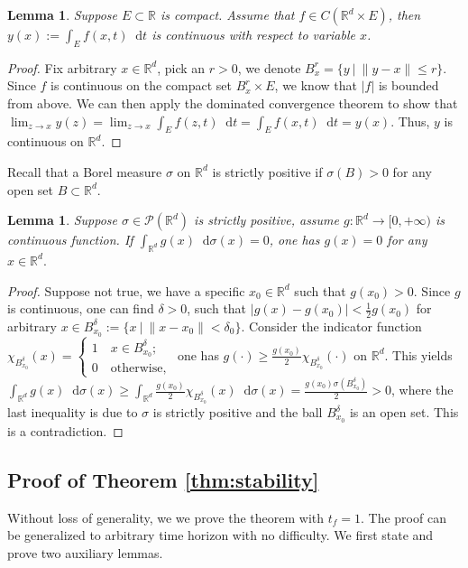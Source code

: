\documentclass{article} %
\theoremstyle{plain}
\newtheorem{lemma}[theorem]{Lemma}
\theoremstyle{definition}
\theoremstyle{remark}
\newcommand*\diff{\mathop{}\!\mathrm{d}}
\begin{document}
\begin{lemma}\label{lemm:continuity}
  Suppose $E\subset\mathbb{R}$ is compact. Assume that $f\in C(\mathbb{R}^d\times E)$, then $y(x) := \int_E f(x, t) \diff t$ is continuous with respect to variable $x$.
\end{lemma}
\begin{proof}
  Fix arbitrary $x\in\mathbb{R}^d$, pick an $r>0$, we denote $B_x^r = \{y \ | \ \|y-x\|\leq r\}.$ Since $f$ is continuous on the compact set $B_x^r\times E$, we know that $|f|$ is bounded from above. We can then apply the dominated convergence theorem to show that $\lim_{z\rightarrow x} y(z) = \lim_{z\rightarrow x} \int_E f(z, t) \diff t = \int_{E} f(x, t) \diff t = y(x)$. Thus, $y$ is continuous on $\mathbb{R}^d$.
\end{proof}

Recall that a Borel measure $\sigma$ on $\mathbb{R}^d$ is strictly positive if $\sigma(B)>0$ for any open set $B \subset\mathbb{R}^d$.

\begin{lemma}\label{lemm:f_equals_0}
  Suppose $\sigma\in\mathscr{P}(\mathbb{R}^d)$ is strictly positive, assume $g:\mathbb{R}^d \rightarrow [0, +\infty)$ is continuous function. If $\int_{\mathbb{R}^d} g(x) \diff \sigma(x) = 0$, one has $g(x)=0$ for any $x\in\mathbb{R}^d.$
\end{lemma}
\begin{proof}
  Suppose not true, we have a specific $x_0\in\mathbb{R}^d$ such that $g(x_0) > 0$. Since $g$ is continuous, one can find $\delta > 0$, such that $|g(x)-g(x_0)|<\frac12 g(x_0)$ for arbitrary $x\in B_{x_0}^\delta := \{x\ |\ \|x - x_0\|<\delta_0\}$. Consider the indicator function $\chi_{B_{x_0}^\delta}(x)=\begin{cases}
      1 \quad x\in B_{x_0}^\delta; \\ 
      0 \quad \textrm{otherwise},
  \end{cases}$ one has $g(\cdot)\geq \frac{g(x_0)}{2}\chi_{B_{x_0}^\delta}(\cdot)$ on $\mathbb{R}^d$. This yields $\int_{\mathbb{R}^d} g(x) \diff \sigma(x) \geq \int_{\mathbb{R}^d} \frac{g(x_0)}{2}\chi_{B_{x_0}^\delta}(x) \diff \sigma(x) = \frac{g(x_0){}\sigma(B_{x_0}^\delta)}{2} > 0$, where the last inequality is due to $\sigma$ is strictly positive and the ball $B_{x_0}^\delta$ is an open set. This is a contradiction.
\end{proof}




\subsection{Proof of Theorem \ref{thm:stability}}\label{sec:proof_stability}
Without loss of generality, we we prove the theorem with $t_f=1$. The proof can be generalized to arbitrary time horizon with no difficulty. We first state and prove two auxiliary lemmas.
\end{document}
